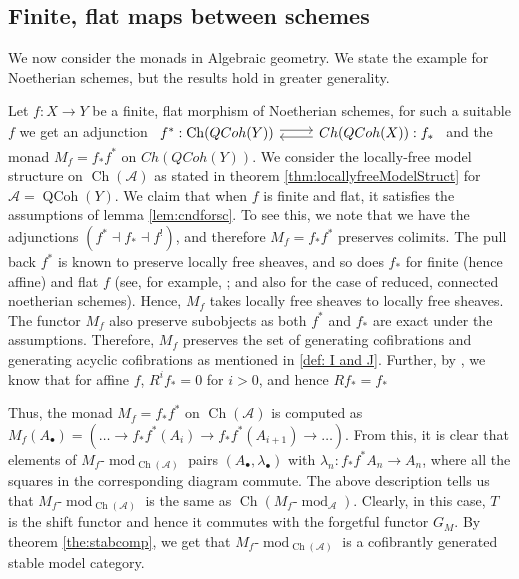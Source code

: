 \documentclass{article}
\newcommand{\adjunction}[4]{\begin{tikzcd}[ampersand replacement=\&] #1 : #2 \arrow[r, shift left] \& #3 : #4 \arrow[l, shift left] \end{tikzcd}}
\newcommand{\module}[2][]{#2\text{-}\modop_{#1}}
\newcommand{\cA}{\mathscr{A}}
\newcommand{\chA}{\Ch(\cA)}
\DeclareMathOperator{\Ch}{Ch}
\DeclareMathOperator{\modop}{mod}
\DeclareMathOperator{\QCoh}{QCoh}
\theoremstyle{definition}
\theoremstyle{remark}
\begin{document}
\subsection{Finite, flat maps between schemes} \label{ssc:finflmor}
 We now consider the monads in Algebraic geometry. We state the example for Noetherian schemes, but the results hold in greater generality.
 
 Let $f: X \rightarrow Y$ be a finite, flat morphism of Noetherian schemes, for such a suitable $f$ we get an adjunction 
 $\adjunction{f^{*}}{\Ch(QCoh(Y))}{Ch(QCoh(X))}{f_{*}}$ and the monad $M_{f}=f_{*}f^{*}$ on $Ch(QCoh(Y))$.
We consider the locally-free model structure on $\chA$ as stated in theorem \ref{thm:locallyfreeModelStruct} for $\mathscr{A} = \QCoh(Y)$.
We claim that when $f$ is finite and flat, it satisfies the assumptions of lemma \ref{lem:cndforsc}. To see this, we note that we have the adjunctions $(f^{*} \dashv f_{*} \dashv f^{!} )$, and therefore $M_{f}=f_{*}f^{*}$ preserves colimits. The pull back $f^*$ is known to preserve locally free sheaves, and so does $f_*$ for finite (hence affine) and flat $f$ (see, for example, 
\cite[\href{https://stacks.math.columbia.edu/tag/02K9}{Tag 02K9}, lemma 29.49.2]{stacks-project}; and also \cite[II, exercise 5.8; III, proposition 9.2]{hartshorne:alggeom} for the case of reduced, connected noetherian schemes).
Hence, $M_f$ takes locally free sheaves to locally free sheaves. The functor $M_f$ also preserve
subobjects as both $f^*$ and $f_*$ are exact under the assumptions.
Therefore, $M_f$ preserves the set of generating cofibrations and generating acyclic 
cofibrations as mentioned in \ref{def: I and J}. Further, by \cite[exercise III, 8.2]{hartshorne:alggeom}, we know that 
for affine $f$, $R^i f_* = 0$ for $i > 0$, and hence $R f_* = f_*$

Thus, the monad $M_f = f_* f^*$ on $\chA$ is
computed as $M_f(A_{\bullet}) = (\dotsc \rightarrow f_* f^*(A_i) \rightarrow f_* f^* 
(A_{i+1}) \rightarrow \dotsc)$. From this, it is clear that elements of $\module[\chA]
{M_f}$ pairs $(A_{\bullet}, \lambda_{\bullet})$ with $\lambda_n \colon f_* f^* A_n 
\longrightarrow A_n$, where all the squares in the corresponding diagram commute.
The above description tells us that $\module[\chA]{M_f}$ is the same as 
$\Ch(\module[\cA]{M_f})$.  
Clearly, in this case, $T$ is the shift functor and hence it commutes with the
forgetful functor $G_M$. 
By theorem \ref{the:stabcomp}, we get that $\module[\chA]{M_f}$ is a 
cofibrantly generated stable model category.
\end{document}
